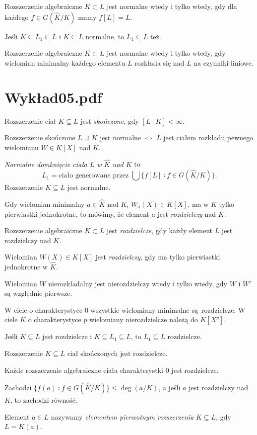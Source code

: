 \documentclass[a4paper, 12pt]{article}
\newcommand{\+}{\enspace}
\begin{document}
Rozszerzenie algebraiczne $K⊂L$ jest normalne wtedy i tylko wtedy,
gdy dla każdego $f∈G(\hat{K}/K)$ mamy $f[L] = L$.

Jeśli $K⊆L_1⊆L$ i $K⊆L$ normalne, to $L_1⊆L$ też.

Rozszerzenie algebraiczne $K⊂L$ jest normalne wtedy i tylko wtedy,
gdy wielomian minimalny każdego elementu $L$
rozkłada się nad $L$ na czynniki liniowe.

\section*{Wykład05.pdf}
Rozszerzenie ciał $K⊆L$ jest \textit{skończone}, gdy $[L∶K]<∞$.

Rozszerzenie skończone $L⊇K$ jest normalne
$⇔$ $L$ jest ciałem rozkładu pewnego wielomianu $W∈K[X]$ nad $K$.

\textit{Normalne domknięcie ciała $L$ w $\hat{K}$ nad $K$} to
$$L_1 = \text{ciało generowane przez }\bigcup \{ f[L] ∶ f∈G(\hat{K}/K)\}.$$
Rozszerzenie $K ⊆ L$ jest normalne.

Gdy wielomian minimalny $a∈\hat{K}$ nad $K$,
$W_a(X) ∈ K[X]$, ma w $\hat{K}$ tylko pierwiastki
jednokrotne,
to mówimy, że element $a$ jest \textit{rozdzielczy} nad $K$.

Rozszerzenie algebraiczne $K⊂L$ jest \textit{rozdzielcze}, gdy
każdy element $L$ jest rozdzielczy nad $K$.

Wielomian $W(X)∈K[X]$ jest \textit{rozdzielczy}, gdy
ma tylko pierwiastki jednokrotne w $\hat{K}$.

Wielomian $W$ nierozkładalny jest
nierozdzielczy wtedy i tylko wtedy, gdy
$W$ i $W'$ są względnie pierwsze.

W ciele o charakterystyce $0$ wszystkie wielomiany minimalne są rozdzielcze.
W ciele $K$ o charakterystyce $p$ wielomiany nierozdzielcze należą do $K[X^p]$.

Jeśli $K⊆L$ jest rozdzielcze i $K⊆L_1⊆L$, to $L_1 ⊆ L$ rozdzielcze.

Rozszerzenie $K⊆L$ ciał skończonych jest rozdzielcze.

Każde rozszerzenie algebraiczne ciała charakterystki $0$ jest rozdzielcze.

Zachodzi $\{f(a) ∶ f∈G(\hat{K}/K)\} ≤ \deg(a/K)$,
a jeśli $a$ jest rozdzielczy nad $K$, to zachodzi równość.

Element $a∈L$ nazywamy \textit{elementem pierwotnym rozszerzenia} $K⊆L$,
gdy $L=K(a)$.
\end{document}

